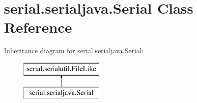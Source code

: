 \hypertarget{classserial_1_1serialjava_1_1_serial}{\section{serial.\-serialjava.\-Serial Class Reference}
\label{classserial_1_1serialjava_1_1_serial}
}
Inheritance diagram for serial.\-serialjava.\-Serial\-:\begin{figure}[H]
\begin{center}
\leavevmode
\includegraphics[height=2.000000cm]{classserial_1_1serialjava_1_1_serial}
\end{center}
\end{figure}
